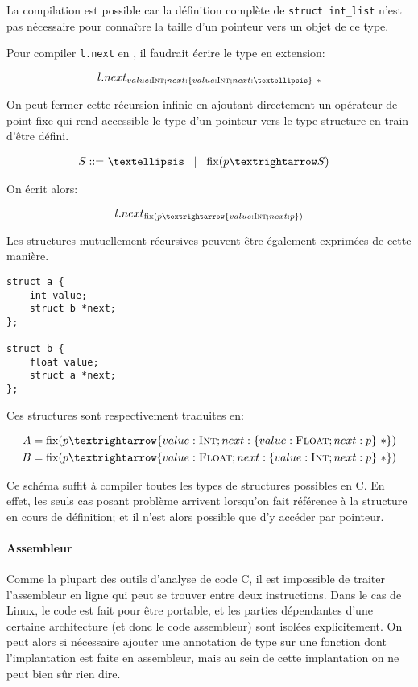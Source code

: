 La compilation est possible car la définition complète de \texttt{struct
int\_list} n'est pas nécessaire pour connaître la taille d'un pointeur vers un
objet de ce type.

Pour compiler \texttt{l.next} en \langname, il faudrait écrire le type en
extension:

\[
  l.next_{ value:\tInt ; next : \{ value : \tInt ; next : … \}~*}
\]

On peut fermer cette récursion infinie en ajoutant directement un opérateur de
point fixe qui rend accessible le type d'un pointeur vers le type structure en
train d'être défini.

\begin{align*}
    S \gramisa & … \gramorx \mathrm{fix}(p → S)
\end{align*}

On écrit alors:

\[
  l.next_{ \mathrm{fix}(p → \{ value : \tInt ; next : p \}) }
\]

Les structures mutuellement récursives peuvent être également exprimées de cette
manière.

\begin{verbatim}
struct a {
    int value;
    struct b *next;
};

struct b {
    float value;
    struct a *next;
};
\end{verbatim}

Ces structures sont respectivement traduites en:

\begin{align*}
  A &= \mathrm{fix} (p → \{ value : \tInt   ; next : \{ value : \tFloat ; next : p \}~* \}) \\
  B &= \mathrm{fix} (p → \{ value : \tFloat ; next : \{ value : \tInt   ; next : p \}~* \})
\end{align*}

Ce schéma suffit à compiler toutes les types de structures possibles en C. En
effet, les seuls cas posant problème arrivent lorsqu'on fait référence à la
structure en cours de définition; et il n'est alors possible que d'y accéder
par pointeur.

\paragraph{Assembleur}

Comme la plupart des outils d'analyse de code C, il est impossible de traiter
l'assembleur en ligne qui peut se trouver entre deux instructions. Dans le cas
de Linux, le code est fait pour être portable, et les parties dépendantes d'une
certaine architecture (et donc le code assembleur) sont isolées explicitement.
On peut alors si nécessaire ajouter une annotation de type sur une fonction dont
l'implantation est faite en assembleur, mais au sein de cette implantation on ne
peut bien sûr rien dire.

